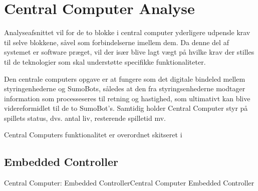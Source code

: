 \section{Central Computer Analyse}\label{sec:CC:analyse}

Analyseafsnittet vil for de to blokke i central computer yderligere udpensle krav til selve blokkene, såvel som forbindelserne imellem dem. Da denne del af systemet er software præget, vil der især blive lagt vægt på hvilke krav der stilles til de teknologier som skal understøtte specifikke funktionaliteter. 

Den centrale computers opgave er at fungere som det digitale bindeled mellem styringenhederne og SumoBots, således at den fra styringsenhederne modtager information som processeseres til retning og hastighed, som ultimativt kan blive videreformidlet til de to SumoBot's. Samtidig holder Central Computer styr på spillets status, dvs. antal liv, resterende spilletid mv. 

Central Computers funktionalitet er overordnet skitseret i 


\subsection{Embedded Controller}
\label{sec:Embedded_Controller}


\begin{PartBlokDescription}{Central Computer: Embedded Controller}{Central Computer Embedded Controller}
\end{PartBlokDescription}

